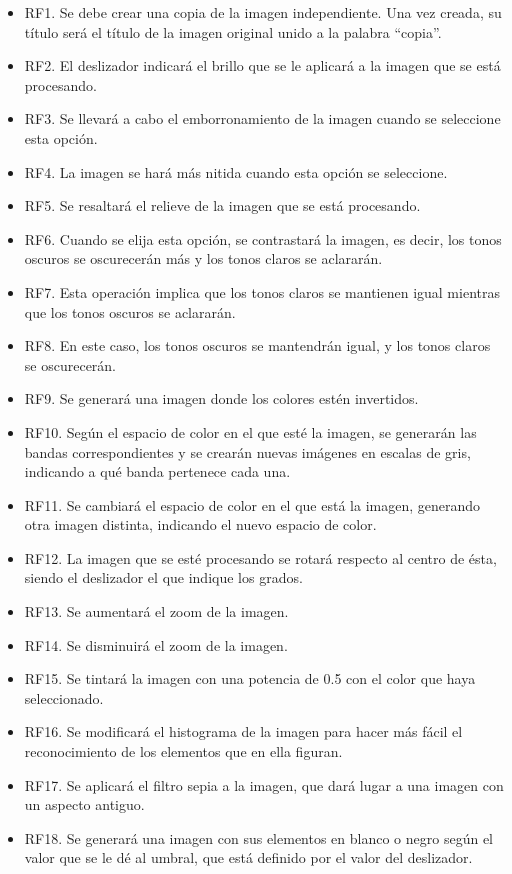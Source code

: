 \documentclass[11pt,a4paper]{article}
\begin{document}
\begin{itemize}
	\item RF1. Se debe crear una copia de la imagen independiente. Una vez creada, su título será el título de la imagen original unido a la palabra ``copia''.
	\item RF2. El deslizador indicará el brillo que se le aplicará a la imagen que se está procesando.
	\item RF3. Se llevará a cabo el emborronamiento de la imagen cuando se seleccione esta opción.
	\item RF4. La imagen se hará más nitida cuando esta opción se seleccione.
	\item RF5. Se resaltará el relieve de la imagen que se está procesando.
	\item RF6. Cuando se elija esta opción, se contrastará la imagen, es decir, los tonos oscuros se oscurecerán más y los tonos claros se aclararán.
	\item RF7. Esta operación implica que los tonos claros se mantienen igual mientras que los tonos oscuros se aclararán.
	\item RF8. En este caso, los tonos oscuros se mantendrán igual, y los tonos claros se oscurecerán.
	\item RF9. Se generará una imagen donde los colores estén invertidos.
	\item RF10. Según el espacio de color en el que esté la imagen, se generarán las bandas correspondientes y se crearán nuevas imágenes en escalas de gris, indicando a qué banda pertenece cada una.
	\item RF11. Se cambiará el espacio de color en el que está la imagen, generando otra imagen distinta, indicando el nuevo espacio de color.
	\item RF12. La imagen que se esté procesando se rotará respecto al centro de ésta, siendo el deslizador el que indique los grados.
	\item RF13. Se aumentará el zoom de la imagen.
	\item RF14. Se disminuirá el zoom de la imagen.
	\item RF15. Se tintará la imagen con una potencia de 0.5 con el color que haya seleccionado.
	\item RF16. Se modificará el histograma de la imagen para hacer más fácil el reconocimiento de los elementos que en ella figuran.
	\item RF17. Se aplicará el filtro sepia a la imagen, que dará lugar a una imagen con un aspecto antiguo.
	\item RF18. Se generará una imagen con sus elementos en blanco o negro según el valor que se le dé al umbral, que está definido por el valor del deslizador.

\end{itemize}
\end{document}

